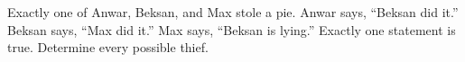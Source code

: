 Exactly one of Anwar, Beksan, and Max stole a pie. Anwar says, ``Beksan did it.'' Beksan says, ``Max did it.'' Max says, ``Beksan is lying.'' Exactly one statement is true. Determine every possible thief.
